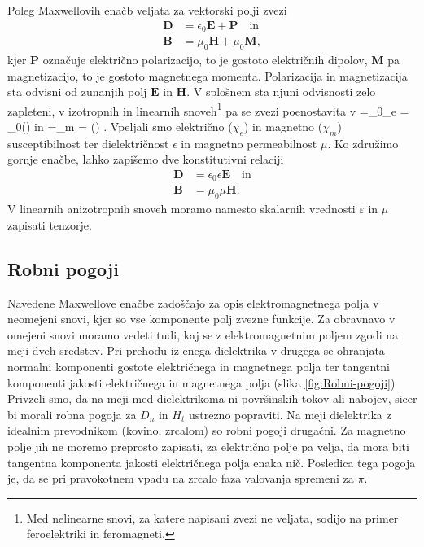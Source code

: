 Poleg Maxwellovih enačb veljata za vektorski polji zvezi
\begin{align}
\mathbf{D} & =\epsilon_{0}\mathbf{E}+\mathbf{P} \quad \mathrm{in}\\
\mathbf{B} & =\mu_{0}\mathbf{H}+\mu_{0}\mathbf{M},
\end{align}
kjer $\mathbf{P}$ označuje električno
polarizacijo, to je gostoto električnih dipolov, $\mathbf{M}$
pa magnetizacijo, to je gostoto magnetnega momenta.
Polarizacija in magnetizacija sta odvisni od zunanjih polj $\mathbf{E}$
in $\mathbf{H}$. V splošnem sta njuni odvisnosti zelo zapleteni,
v izotropnih in linearnih snoveh\footnote{ Med nelinearne snovi, za katere napisani zvezi ne veljata,
sodijo na primer feroelektriki in feromagneti.}
pa se zvezi poenostavita v 
\beq
{}=\epsilon_{0}\chi_e = \epsilon_{0}() \qquad \textrm{in} 
\qquad
{}=\chi_m  = ()
\label{eq:PM}.
\eeq
Vpeljali smo  električno ($\chi_e$) in 
magnetno ($\chi_m$) susceptibilnost ter
dielektričnost $\epsilon$ in
magnetno permeabilnost $\mu$. Ko združimo gornje
enačbe, lahko zapišemo dve konstitutivni
relaciji
\begin{align}
\mathbf{D} & =\epsilon_{0}\epsilon\mathbf{E}\quad \mathrm{in}\\
\mathbf{B} & =\mu_{0}\mu\mathbf{H}.
\end{align}
V linearnih anizotropnih snoveh moramo namesto skalarnih vrednosti $\varepsilon$
in $\mu$ zapisati tenzorje. 

\subsection*{Robni pogoji}
Navedene Maxwellove enačbe zadoščajo za opis elektromagnetnega polja
v neomejeni snovi, kjer so vse komponente polj zvezne funkcije. Za
obravnavo v omejeni snovi moramo vedeti tudi, kaj se z elektromagnetnim
poljem zgodi na meji dveh sredstev. Pri prehodu
iz enega dielektrika v drugega se ohranjata normalni komponenti gostote
električnega in magnetnega polja ter tangentni komponenti jakosti
električnega in magnetnega polja (slika \ref{fig:Robni-pogoji}) 
Privzeli smo, da na meji med dielektrikoma ni površinskih
tokov ali nabojev, sicer bi morali robna pogoja za $D_n$ in $H_t$
ustrezno popraviti. Na meji dielektrika z idealnim prevodnikom (kovino,
zrcalom) so robni pogoji drugačni. Za magnetno polje jih ne moremo
preprosto zapisati, za električno polje pa velja, da mora biti tangentna
komponenta jakosti električnega polja enaka nič. Posledica tega 
pogoja je, da se pri pravokotnem vpadu na zrcalo faza valovanja
spremeni za $\pi$. 

